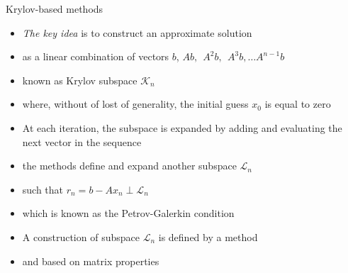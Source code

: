 \begin{frame}[t]{Krylov-based methods}
    \small
    \begin{itemize}
    	\item \textit{The key idea} is to construct an approximate solution 
    	\item as a linear combination of vectors $b$, $Ab, \:\: A^2b, \:\: A^3b, \dots A^{n-1}b$
    	\item known as Krylov subspace $\mathcal{K}_{n}$
    	
    	\item where, without of lost of generality, the initial guess $x_0$ is equal to zero
    	
    	\item At each iteration, the subspace is expanded by adding and evaluating the next vector in the sequence
    \end{itemize}

	\begin{itemize}
		\item the methods define and expand another subspace $\mathcal{L}_{n}$ 
		
		\item such that $r_{n} = b - Ax_{n} \perp \mathcal{L}_{n}$ 
		
		\item which is known as the Petrov-Galerkin condition
		
		\item A construction of subspace $\mathcal{L}_{n}$ is defined by a method
		
		\item and based on matrix properties
		
	\end{itemize}
\end{frame}